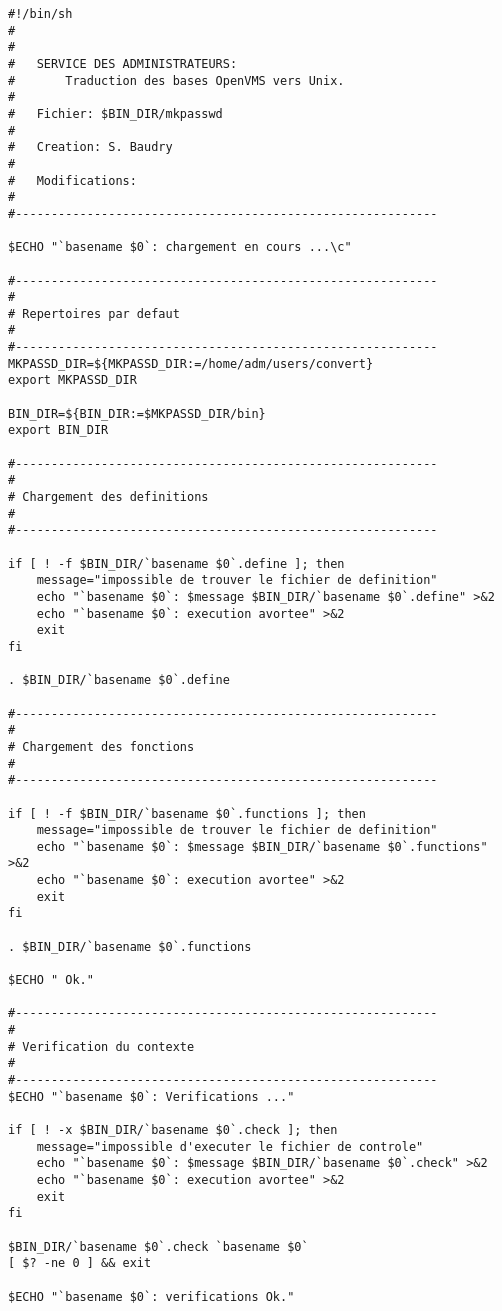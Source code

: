 \begin{verbatim}
#!/bin/sh
#
#
#   SERVICE DES ADMINISTRATEURS:
#       Traduction des bases OpenVMS vers Unix.
#
#   Fichier: $BIN_DIR/mkpasswd
#
#   Creation: S. Baudry
#
#   Modifications:
#
#-----------------------------------------------------------

$ECHO "`basename $0`: chargement en cours ...\c"

#-----------------------------------------------------------
#
# Repertoires par defaut
#
#-----------------------------------------------------------
MKPASSD_DIR=${MKPASSD_DIR:=/home/adm/users/convert}
export MKPASSD_DIR

BIN_DIR=${BIN_DIR:=$MKPASSD_DIR/bin}
export BIN_DIR

#-----------------------------------------------------------
#
# Chargement des definitions
#
#-----------------------------------------------------------

if [ ! -f $BIN_DIR/`basename $0`.define ]; then
	message="impossible de trouver le fichier de definition"
    echo "`basename $0`: $message $BIN_DIR/`basename $0`.define" >&2
    echo "`basename $0`: execution avortee" >&2
    exit
fi

. $BIN_DIR/`basename $0`.define

#-----------------------------------------------------------
#
# Chargement des fonctions
#
#-----------------------------------------------------------

if [ ! -f $BIN_DIR/`basename $0`.functions ]; then
	message="impossible de trouver le fichier de definition"
    echo "`basename $0`: $message $BIN_DIR/`basename $0`.functions" >&2
    echo "`basename $0`: execution avortee" >&2
    exit
fi

. $BIN_DIR/`basename $0`.functions

$ECHO " Ok."

#-----------------------------------------------------------
#
# Verification du contexte
#
#-----------------------------------------------------------
$ECHO "`basename $0`: Verifications ..."

if [ ! -x $BIN_DIR/`basename $0`.check ]; then
	message="impossible d'executer le fichier de controle"
    echo "`basename $0`: $message $BIN_DIR/`basename $0`.check" >&2
    echo "`basename $0`: execution avortee" >&2
    exit
fi

$BIN_DIR/`basename $0`.check `basename $0`
[ $? -ne 0 ] && exit

$ECHO "`basename $0`: verifications Ok."


\end{verbatim}
